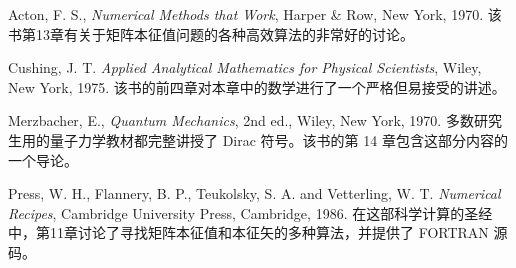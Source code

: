 \begin{description}
 \item{Acton, F. S., \textit{Numerical Methods that Work}, Harper \& Row, New York, 1970.} 该书第13章有关于矩阵本征值问题的各种高效算法的非常好的讨论。
 \item{Cushing, J. T. \textit{Applied Analytical Mathematics for Physical Scientists}, Wiley, New York, 1975.} 该书的前四章对本章中的数学进行了一个严格但易接受的讲述。
 \item{Merzbacher, E., \textit{Quantum Mechanics}, 2nd ed., Wiley, New York, 1970.} 多数研究生用的量子力学教材都完整讲授了 Dirac 符号。该书的第 14 章包含这部分内容的一个导论。
 \item{Press, W. H., Flannery, B. P., Teukolsky, S. A. and Vetterling, W. T. \textit{Numerical Recipes}, Cambridge University Press, Cambridge, 1986.} 在这部科学计算的圣经中，第11章讨论了寻找矩阵本征值和本征矢的多种算法，并提供了 FORTRAN 源码。
\end{description}
